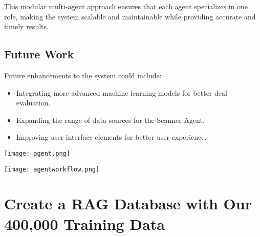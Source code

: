 \documentclass[a4paper, 12pt]{article}
\begin{document}
This modular multi-agent approach ensures that each agent specializes in one role, making the system scalable and maintainable while providing accurate and timely results.

\subsection*{Future Work}

Future enhancements to the system could include:
\begin{itemize}
    \item Integrating more advanced machine learning models for better deal evaluation.
    \item Expanding the range of data sources for the Scanner Agent.
    \item Improving user interface elements for better user experience.
\end{itemize}
\vspace{2cm}

\texttt{[image: agent.png]}

\vspace{1cm}
\texttt{[image: agentworkflow.png]}

\section*{Create a RAG Database with Our 400,000 Training Data}

\end{document}
